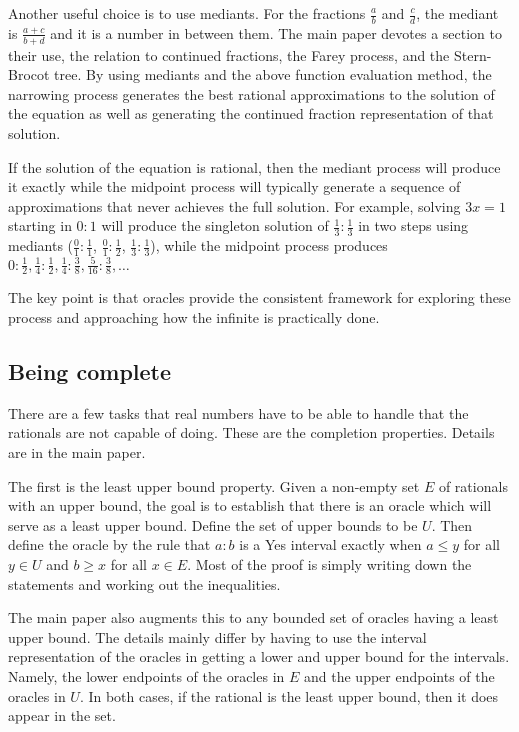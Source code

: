 \documentclass[12pt]{article}
\theoremstyle{remark}
\begin{document}
Another useful choice is to use mediants. For the fractions $\frac{a}{b}$ and $\frac{c}{d}$, the mediant is $\frac{a+c}{b+d}$ and it is a number in between them. The main paper devotes a section to their use, the relation to continued fractions, the Farey process, and the Stern-Brocot tree. By using mediants and the above function evaluation method, the narrowing process generates the best rational approximations to the solution of the equation as well as generating the continued fraction representation of that solution. 

If the solution of the equation is rational, then the mediant process will produce it exactly while the midpoint process will typically generate a sequence of approximations that never achieves the full solution. For example, solving $3x = 1$ starting in $0:1$ will produce the singleton solution of $\frac{1}{3}:\frac{1}{3}$ in two steps using mediants ($\frac{0}{1}:\frac{1}{1}$, $\frac{0}{1}:\frac{1}{2}$, $\frac{1}{3}:\frac{1}{3}$), while the midpoint process produces $0:\frac{1}{2}, \frac{1}{4}: \frac{1}{2}, \frac{1}{4}: \frac{3}{8}, \frac{5}{16}: \frac{3}{8}, \ldots$

The key point is that oracles provide the consistent framework for exploring these process and approaching how the infinite is practically done. 

\subsection{Being complete}

There are a few tasks that real numbers have to be able to handle that the rationals are not capable of doing. These are the completion properties. Details are in the main paper.

The first is the least upper bound property. Given a non-empty set $E$ of rationals with an upper bound, the goal is  to establish that there is an oracle which will serve as a least upper bound. Define the set of upper bounds to be $U$. Then define the oracle by the rule that $a:b$ is a Yes interval exactly when $a\leq y$ for all $y \in U$ and $b\geq x$ for all $x\in E$. Most of the proof is simply writing down the statements and working out the inequalities. 

The main paper also augments this to any bounded set of oracles having a least upper bound. The details mainly differ by having to use the interval representation of the oracles in getting a lower and upper bound for the intervals. Namely, the lower endpoints of the oracles in $E$ and the upper endpoints of the oracles in $U$. In both cases, if the rational is the least upper bound, then it does appear in the set. 
\end{document}
